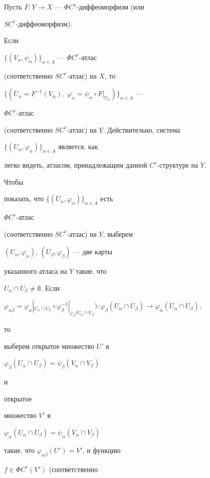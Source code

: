 \begin{pf}


Пусть $F:Y\to X$ --- $\Phi C^r$-диффеоморфизм (или


$SC^r$-диффеоморфизм).


Если


$\{(V_\alpha,\psi_\alpha)\}_{\alpha\in A}$ --- $\Phi C^r$-атлас


(соответственно $SC^r$-атлас) на $X$, то


$\{(U_\alpha=F^{-1}(V_\alpha),\;


\varphi_\alpha=\psi_\alpha\circ F|_{U_\alpha})\}_{\alpha\in A}$ ---


$\Phi C^r$-атлас


(соответственно $SC^r$-атлас) на $Y$. Действительно, система


$\{(U_\alpha,\varphi_\alpha)\}_{\alpha\in A}$ является, как


легко видеть, атласом, принадлежащим данной $C^r$-структуре на $Y$.


Чтобы


показать, что $\{(U_\alpha,\varphi_\alpha)\}_{\alpha\in A}$ есть


$\Phi C^r$-атлас


(соответственно $SC^r$-атлас) на $Y$, выберем


$(U_\alpha,\varphi_\alpha)$, $(U_\beta,\varphi_\beta)$ --- две карты


указанного атласа на $Y$ такие, что


$U_\alpha\cap U_\beta\ne\emptyset$. Если


$\varphi_{\alpha\beta}=\varphi_\alpha|_{U_\alpha\cap U_\beta}


\circ\varphi^{-1}_\beta|_{\varphi_\beta(U_\alpha\cap U_\beta}):


\varphi_\beta(U_\alpha\cap U_\beta)\to\varphi_\alpha(U_\alpha\cap U_\beta)$,


то


выберем открытое множество $U'$ в


$\varphi_\beta(U_\alpha\cap U_\beta)=\psi_\beta(V_\alpha\cap V_\beta)$


и


открытое


множество $V'$ в


$\varphi_\alpha(U_\alpha\cap U_\beta)=\psi_\alpha(V_\alpha\cap V_\beta)$


такие, что $\varphi_{\alpha\beta}(U')=V'$, и функцию


$f\in\Phi C^r(V')$ (соответственно



\end{pf}
